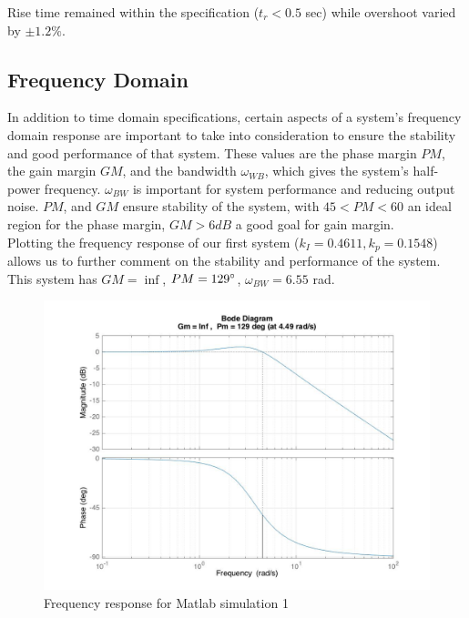 \documentclass[11pt,titlepage]{article}
\begin{document}
	\noindent Rise time remained within the specification ($t_r<0.5$ sec) while overshoot varied by $\pm1.2\%$.
	
    \subsection{Frequency Domain}
    	In addition to time domain specifications, certain aspects of a system's frequency domain response are important to take into consideration to ensure the stability and good performance of that system. These values are the phase margin $PM$, the gain margin $GM$, and the bandwidth $\omega_{WB}$, which gives the system's half-power frequency. $\omega_{BW}$ is important for system performance and reducing output noise. $PM$, and $GM$ ensure stability of the system, with $45<PM<60$ an ideal region for the phase margin, $GM>6dB$ a good goal for gain margin.\\
	
	\noindent Plotting the frequency response of our first system ($k_I=0.4611, k_p=0.1548$) allows us to further comment on the stability and performance of the system. This system has $GM=\inf$, $PM=129\degree$, $\omega_{BW}=6.55$ rad.
	\begin{figure}[H]
        \centering
        \includegraphics[scale=.3]{Hyr_freq1_bode}
        \caption{Frequency response for Matlab simulation 1}
        \label{fig:Hyr_freq1_bode}
    \end{figure} 
    
\end{document}
